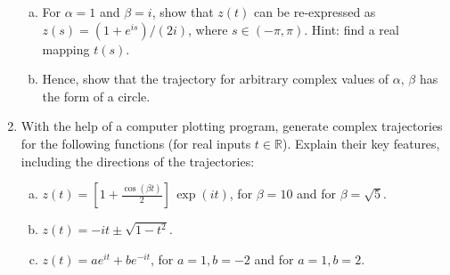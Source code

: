 \documentclass[10pt,a4paper]{article}
\begin{document}
\begin{enumerate}
  \begin{enumerate}[(a)]
  \item
    For $\alpha = 1$ and $\beta = i$, show that $z(t)$ can be
    re-expressed as $z(s) = (1+e^{is})/(2i)$, where
    $s \in (-\pi,\pi)$. Hint: find a real mapping $t(s)$.

  \item
    Hence, show that the trajectory for arbitrary complex values of
    $\alpha,\, \beta$ has the form of a circle.
  \end{enumerate}

\item
  With the help of a computer plotting program, generate complex
  trajectories for the following functions (for real inputs $t
  \in\mathbb{R}$). Explain their key features, including the
  directions of the trajectories:
  \begin{enumerate}[(a)]
  \item
    $\displaystyle z(t) = \left[1+\frac{\cos(\beta t)}{2}\right] \, \exp(it)$,
    for $\beta = 10$ and for $\beta = \sqrt{5}$.
  \item
    $\displaystyle z(t) = -it \pm \sqrt{1 - t^2}$.
  \item
    $\displaystyle z(t) = ae^{it} + be^{-it}$, for $a = 1, b = -2$
    and for $a = 1, b = 2$.
  \end{enumerate}
\end{enumerate}
\end{document}
